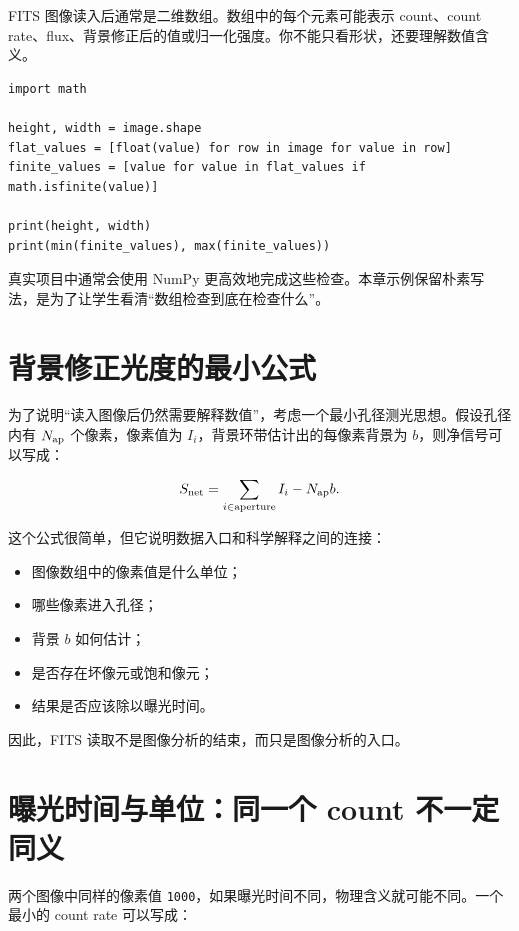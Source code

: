FITS 图像读入后通常是二维数组。数组中的每个元素可能表示 count、count rate、flux、背景修正后的值或归一化强度。你不能只看形状，还要理解数值含义。

\begin{examplebox}[最小数组检查]
\begin{lstlisting}[style=pythonstyle]
import math

height, width = image.shape
flat_values = [float(value) for row in image for value in row]
finite_values = [value for value in flat_values if math.isfinite(value)]

print(height, width)
print(min(finite_values), max(finite_values))
\end{lstlisting}
\end{examplebox}

真实项目中通常会使用 NumPy 更高效地完成这些检查。本章示例保留朴素写法，是为了让学生看清“数组检查到底在检查什么”。

\section{背景修正光度的最小公式}

为了说明“读入图像后仍然需要解释数值”，考虑一个最小孔径测光思想。假设孔径内有 \(N_{\rm ap}\) 个像素，像素值为 \(I_i\)，背景环带估计出的每像素背景为 \(b\)，则净信号可以写成：

\[
S_{\rm net} = \sum_{i \in \mathrm{aperture}} I_i - N_{\rm ap} b.
\]

这个公式很简单，但它说明数据入口和科学解释之间的连接：

\begin{itemize}
    \item 图像数组中的像素值是什么单位；
    \item 哪些像素进入孔径；
    \item 背景 \(b\) 如何估计；
    \item 是否存在坏像元或饱和像元；
    \item 结果是否应该除以曝光时间。
\end{itemize}

因此，FITS 读取不是图像分析的结束，而只是图像分析的入口。

\section{曝光时间与单位：同一个 count 不一定同义}

两个图像中同样的像素值 \texttt{1000}，如果曝光时间不同，物理含义就可能不同。一个最小的 count rate 可以写成：

